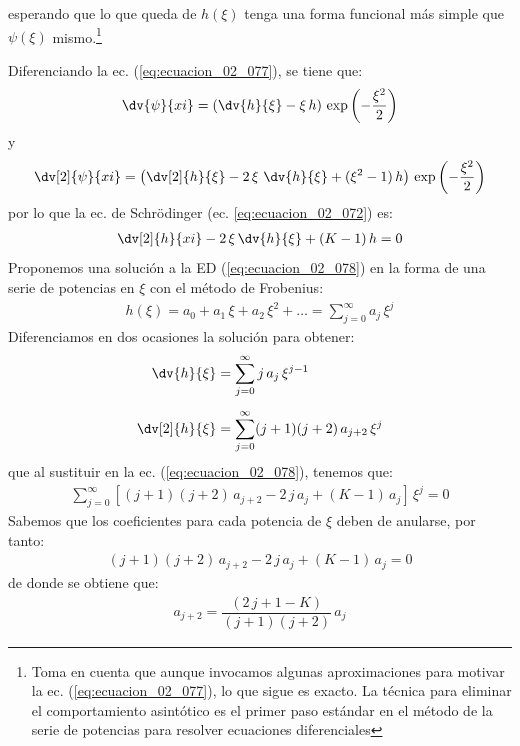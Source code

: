 esperando que lo que queda de $h (\xi)$ tenga una forma funcional más simple que $\psi (\xi)$ mismo.\footnote{Toma en cuenta que aunque invocamos algunas aproximaciones para motivar la ec. (\ref{eq:ecuacion_02_077}), lo que sigue es exacto. La técnica para eliminar el comportamiento asintótico es el primer paso estándar en el método de la serie de potencias para resolver ecuaciones diferenciales}
\par
Diferenciando la ec. (\ref{eq:ecuacion_02_077}), se tiene que:
\begin{align*}
\dv{\psi}{xi} = \left( \dv{h}{\xi} - \xi \, h \right) \, \exp \left( - \dfrac{\xi^{2}}{2} \right)
\end{align*}
y
\begin{align*}
\dv[2]{\psi}{xi} = \left( \dv[2]{h}{\xi} - 2  \,  \xi \, \, \dv{h}{\xi} + (\xi^{2} - 1) \, h \right) \, \exp \left( - \dfrac{\xi^{2}}{2} \right)
\end{align*}
por lo que la ec. de Schrödinger (ec. \ref{eq:ecuacion_02_072}) es:
\begin{align}
\dv[2]{h}{xi} - 2 \, \xi \, \dv{h}{\xi} +  (K - 1) \, h = 0
\label{eq:ecuacion_02_078}
\end{align}
Proponemos una solución a la ED (\ref{eq:ecuacion_02_078}) en la forma de una serie de potencias en $\xi$ con el método de Frobenius:
\begin{align}
h (\xi) = a_{0} + a_{1} \, \xi + a_{2} \, \xi^{2} + \ldots = \sum_{j=0}^{\infty} a_{j} \, \xi^{j}
\label{eq:ecuacion_02_079}
\end{align}
Diferenciamos en dos ocasiones la solución para obtener:
\begin{align*}
\dv{h}{\xi} &= \sum_{j=0}^{\infty} j \, a_{j} \, \xi^{j-1} \\[0.5em]
\dv[2]{h}{\xi} &= \sum_{j=0}^{\infty} (j + 1)(j + 2) \, a_{j+2} \, \xi^{j}
\end{align*}
que al sustituir en la ec. (\ref{eq:ecuacion_02_078}), tenemos que:
\begin{align}
\sum_{j=0}^{\infty} [ (j + 1)(j + 2) \, a_{j+2} - 2 \, j \, a_{j} +  (K - 1) \, a_{j} ] \, \xi^{j} = 0
\label{eq:ecuacion_02_80}
\end{align}
Sabemos que los coeficientes para cada potencia de $\xi$ deben de anularse, por tanto:
\begin{align*}
(j + 1)(j + 2) \, a_{j+2} - 2 \, j \, a_{j} +  (K - 1) \, a_{j} = 0
\end{align*}
de donde se obtiene que:
\begin{align}
a_{j+2} = \dfrac{(2 \, j + 1 - K)}{(j + 1)(j + 2)} \, a_{j}
\label{eq:ecuacion_02_081}
\end{align}
